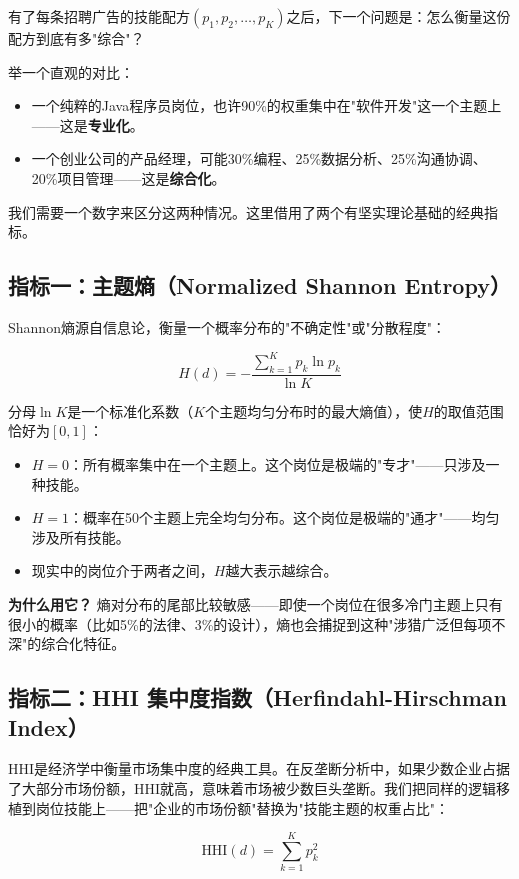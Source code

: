 \documentclass[12pt, a4paper, fontset=none]{ctexart}
\begin{document}
有了每条招聘广告的技能配方$(p_1, p_2, \ldots, p_K)$之后，下一个问题是：怎么衡量这份配方到底有多"综合"？

举一个直观的对比：
\begin{itemize}
    \item 一个纯粹的Java程序员岗位，也许90\%的权重集中在"软件开发"这一个主题上——这是\textbf{专业化}。
    \item 一个创业公司的产品经理，可能30\%编程、25\%数据分析、25\%沟通协调、20\%项目管理——这是\textbf{综合化}。
\end{itemize}

我们需要一个数字来区分这两种情况。这里借用了两个有坚实理论基础的经典指标。

\subsection{指标一：主题熵（Normalized Shannon Entropy）}

Shannon熵源自信息论，衡量一个概率分布的"不确定性"或"分散程度"：

\[
    H(d) = -\frac{\sum_{k=1}^{K} p_k \ln p_k}{\ln K}
\]

分母$\ln K$是一个标准化系数（$K$个主题均匀分布时的最大熵值），使$H$的取值范围恰好为$[0, 1]$：

\begin{itemize}
    \item $H = 0$：所有概率集中在一个主题上。这个岗位是极端的"专才"——只涉及一种技能。
    \item $H = 1$：概率在50个主题上完全均匀分布。这个岗位是极端的"通才"——均匀涉及所有技能。
    \item 现实中的岗位介于两者之间，$H$越大表示越综合。
\end{itemize}

\textbf{为什么用它？} 熵对分布的尾部比较敏感——即使一个岗位在很多冷门主题上只有很小的概率（比如5\%的法律、3\%的设计），熵也会捕捉到这种"涉猎广泛但每项不深"的综合化特征。

\subsection{指标二：HHI 集中度指数（Herfindahl-Hirschman Index）}

HHI是经济学中衡量市场集中度的经典工具。在反垄断分析中，如果少数企业占据了大部分市场份额，HHI就高，意味着市场被少数巨头垄断。我们把同样的逻辑移植到岗位技能上——把"企业的市场份额"替换为"技能主题的权重占比"：

\[
    \text{HHI}(d) = \sum_{k=1}^{K} p_k^2
\]
\end{document}
